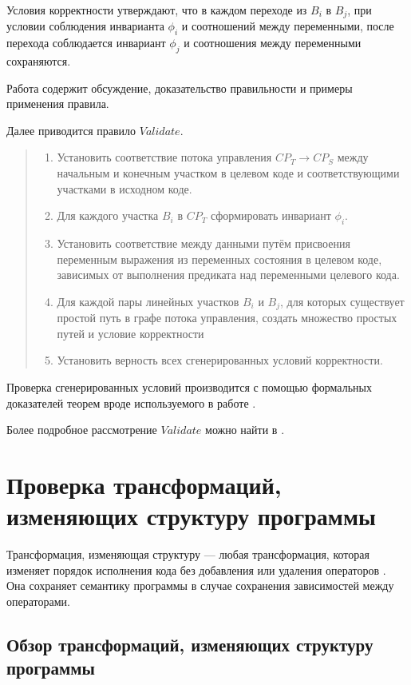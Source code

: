 Условия корректности утверждают, что в каждом переходе из $B_{i}$ в $B_{j}$, при условии соблюдения инварианта $\phi_{i}$ и соотношений между переменными, после перехода соблюдается инвариант $\phi_{j}$ и соотношения между переменными сохраняются.

Работа \cite{ZPFG02} содержит обсуждение, доказательство правильности и примеры применения правила.

Далее приводится правило $Validate$.

\begin{quote}
	\begin{enumerate}
		\item Установить соответствие потока управления $CP_{T} \rightarrow CP_{S}$ между начальным и конечным участком в целевом коде и соответствующими участками в исходном коде.
		\item Для каждого участка $B_{i}$ в $CP_{T}$ сформировать инвариант $\phi_{i}$.
		\item Установить соответствие между данными путём присвоения переменным выражения из переменных состояния в целевом коде, зависимых от выполнения предиката над переменными целевого кода.
		\item Для каждой пары линейных участков $B_{i}$ и $B_{j}$, для которых существует простой путь в графе потока управления, создать множество простых путей и условие корректности
		\item Установить верность всех сгенерированных условий корректности.
	\end{enumerate}
\end{quote}

Проверка сгенерированных условий производится с помощью формальных доказателей теорем вроде используемого в работе \cite{PRSS99}.

Более подробное рассмотрение $Validate$ можно найти в \cite{ZuckPFGH02}.

\section{Проверка трансформаций, изменяющих структуру программы}

Трансформация, изменяющая структуру --- любая трансформация, которая изменяет порядок исполнения кода без добавления или удаления операторов \cite{Bacon,AK02}. Она сохраняет семантику программы в случае сохранения зависимостей между операторами.

\subsection{Обзор трансформаций, изменяющих структуру программы}

